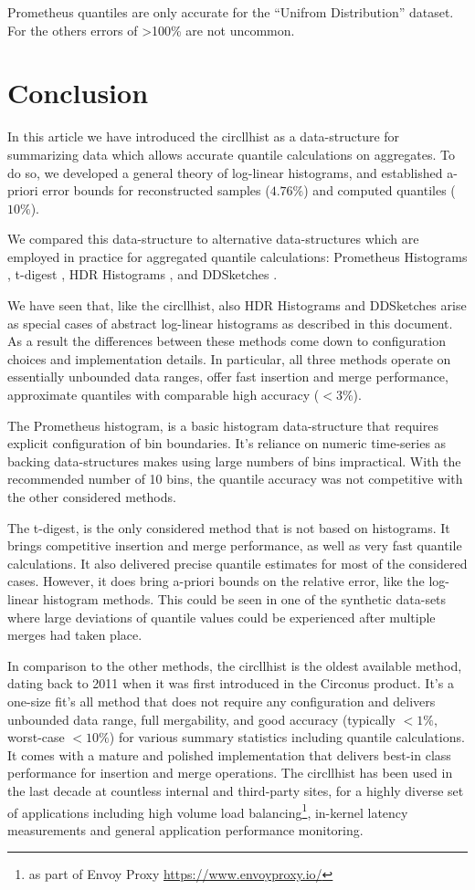 \documentclass{article}
\theoremstyle{plain}
\theoremstyle{remark}
\begin{document}
Prometheus quantiles are only accurate for the ``Unifrom Distribution'' dataset.
For the others errors of >100\% are not uncommon.

\section{Conclusion}

In this article we have introduced the circllhist as a data-structure for summarizing data which
allows accurate quantile calculations on aggregates.  To do so, we developed a general theory of
log-linear histograms, and established a-priori error bounds for reconstructed samples ($4.76\%$)
and computed quantiles ($10\%$).

We compared this data-structure to alternative data-structures which are employed in practice for
aggregated quantile calculations: Prometheus Histograms \cite{prom}, t-digest \cite{tdigest}, HDR
Histograms \cite{hdr}, and DDSketches \cite{dd}.

We have seen that, like the circllhist, also HDR Histograms and DDSketches arise as special cases of
abstract log-linear histograms as described in this document. As a result the differences between
these methods come down to configuration choices and implementation details.  In particular, all
three methods operate on essentially unbounded data ranges, offer fast insertion and merge
performance, approximate quantiles with comparable high accuracy ($<3\%$).

The Prometheus histogram, is a basic histogram data-structure that requires explicit configuration
of bin boundaries. It's reliance on numeric time-series as backing data-structures makes using large
numbers of bins impractical. With the recommended number of 10 bins, the quantile accuracy was not
competitive with the other considered methods.

The t-digest, is the only considered method that is not based on histograms. It brings competitive
insertion and merge performance, as well as very fast quantile calculations. It also delivered
precise quantile estimates for most of the considered cases. However, it does bring a-priori bounds
on the relative error, like the log-linear histogram methods. This could be seen in one of the
synthetic data-sets where large deviations of quantile values could be experienced after multiple
merges had taken place.

In comparison to the other methods, the circllhist is the oldest available method, dating back to
2011 when it was first introduced in the Circonus product. It's a one-size fit's all method that
does not require any configuration and delivers unbounded data range, full mergability, and good
accuracy (typically $<1\%$, worst-case $<10\%$) for various summary statistics including quantile
calculations. It comes with a mature and polished implementation that delivers best-in class
performance for insertion and merge operations. The circllhist has been used in the last decade at
countless internal and third-party sites, for a highly diverse set of applications including high
volume load balancing\footnote{as part of Envoy Proxy \url{https://www.envoyproxy.io/}}, in-kernel
latency measurements\cite{HHBPF} and general application performance monitoring.
\end{document}
